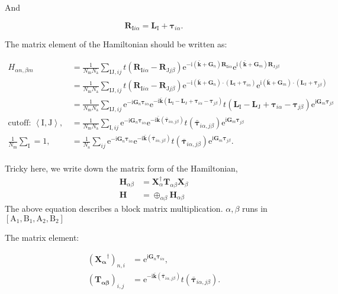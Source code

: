 \documentclass[%
 amsmath,amssymb,
rmp,
]{revtex4-1}
\def \bkbar {\bar{\mathbf{k}}}
\def \bG    {\mathbf{G}}
\def \e     {\mathrm{e}}
\def \I     {\mathrm{I}}
\def \J     {\mathrm{J}}
\def \i     {\mathrm{i}}
\def \bR    {\mathbf{R}}
\def \bL    {\mathbf{L}}
\def \btau  {\bm{\tau}}
\def \bH    {\mathbf{H}}
\begin{document}
And

\begin{equation}
\bR_{\I i \alpha} = \bL_{\I} + \btau_{i \alpha}.
\end{equation}

The matrix element of the Hamiltonian should be written as:

\begin{equation}
\begin{aligned}
H_{\alpha n, \beta m} &= \frac{1}{N_\mathrm{m} N_\mathrm{a}} \sum_{\I \J,ij} t(\bR_{\I i \alpha}-\bR_{\J j \beta})
\e^{-\i(\bkbar+\bG_n)\bR_{\I i \alpha}} \e^{\i(\bkbar+\bG_m)\bR_{\J j \beta}} \\
&= \frac{1}{N_\mathrm{m} N_\mathrm{a}} \sum_{\I \J,ij} t(\bR_{\I i \alpha}-\bR_{\J j \beta})
\e^{-\i(\bkbar+\bG_n)\cdot(\bL_{\I} +\btau_{i\alpha})} \e^{\i(\bkbar+\bG_m)\cdot(\bL_{\J} +\btau_{j\beta})} \\
&=\frac{1}{N_\mathrm{m} N_\mathrm{a}} \sum_{\I \J,ij} \e^{-\i \bG_n \btau_{i\alpha}} \e^{-\i \bkbar (\bL_\I -\bL_\J+\btau_{i\alpha}-\btau_{j\beta})} 
t(\bL_\I -\bL_\J+\btau_{i\alpha}-\btau_{j\beta}) \e^{\i \bG_m \btau_{j\beta}}\\
\text{cutoff: $\left<\I, \J\right>$,}\,\,&= \frac{1}{N_\mathrm{m} N_\mathrm{a}} \sum_{\I ,ij} \e^{-\i \bG_n \btau_{i\alpha}} \e^{-\i \bkbar (\bar{\btau}_{i\alpha, j\beta})} 
t(\bar{\btau}_{i\alpha, j\beta}) \e^{\i \bG_m \btau_{j\beta}} \\
\text{$\frac{1}{N_{\mathrm{m}}}\sum_{\I} =1$,}\,\,&=\frac{1}{N_\mathrm{a}} \sum_{ij} \e^{-\i \bG_n \btau_{i\alpha}} \e^{-\i \bkbar (\bar{\btau}_{i\alpha, j\beta})} 
t(\bar{\btau}_{i\alpha, j\beta}) \e^{\i \bG_m \btau_{j\beta}}. \\
\end{aligned}
\end{equation}

Tricky here, we write down the matrix form of the Hamiltonian,
\begin{equation}
\begin{aligned}
\bH_{\alpha\beta} &= \mathbf{X}^\dagger_{\alpha} \mathbf{T}_{\alpha\beta} \mathbf{X}_{\beta} \\
\bH &= \oplus_{\alpha \beta} \bH_{\alpha\beta}
\end{aligned}
\end{equation}
The above equation describes a block matrix multiplication. $\alpha,\beta$ runs in $[\mathrm{A}_1,\mathrm{B}_1, \mathrm{A}_2, \mathrm{B}_2]$

The matrix element:

\begin{equation}
\begin{aligned}
(\mathbf{X_\alpha}^\dagger)_{n,i}  &=\e^{\i\bG_n\btau_{i\alpha}},\\
(\mathbf{T_{\alpha \beta}})_{i, j} &= \e^{-\i \bkbar (\bar{\btau}_{i\alpha, j\beta})} 
t(\bar{\btau}_{i\alpha, j\beta}).
\end{aligned}
\end{equation}
\end{document}
